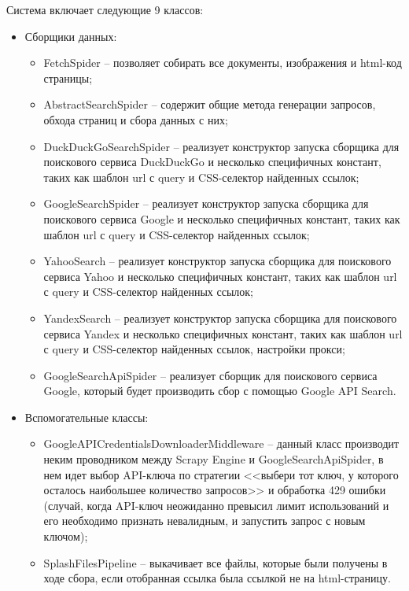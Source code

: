 Система включает следующие 9 классов:
\begin{itemize}
    \item Сборщики данных:
    \begin{itemize}
        \item FetchSpider -- позволяет собирать все документы, изображения и html-код страницы;  
        \item AbstractSearchSpider -- содержит общие метода генерации запросов, обхода страниц и сбора данных с них;
        \item DuckDuckGoSearchSpider -- реализует конструктор запуска сборщика для поискового сервиса DuckDuckGo и несколько 
        специфичных констант, таких как шаблон url с query и CSS-селектор найденных ссылок;
        \item GoogleSearchSpider -- реализует конструктор запуска сборщика для поискового сервиса Google и несколько 
        специфичных констант, таких как шаблон url с query и CSS-селектор найденных ссылок;
        \item YahooSearch -- реализует конструктор запуска сборщика для поискового сервиса Yahoo и несколько 
        специфичных констант, таких как шаблон url с query и CSS-селектор найденных ссылок;
        \item YandexSearch -- реализует конструктор запуска сборщика для поискового сервиса Yandex и несколько 
        специфичных констант, таких как шаблон url с query и CSS-селектор найденных ссылок, настройки прокси;
        \item GoogleSearchApiSpider -- реализует сборщик для поискового сервиса Google, который будет
        производить сбор с помощью Google API Search.
    \end{itemize}
    \item Вспомогательные классы:
    \begin{itemize}
        \item GoogleAPICredentialsDownloaderMiddleware -- данный класс производит неким проводником между Scrapy Engine и 
        GoogleSearchApiSpider, в нем идет выбор API-ключа по стратегии <<выбери тот ключ, у которого осталось 
        наибольшее количество запросов>> и обработка 429 ошибки (случай, когда API-ключ неожиданно превысил лимит 
        использований и его необходимо признать невалидным, и запустить запрос с новым ключом);
        \item SplashFilesPipeline -- выкачивает все файлы, которые были получены в ходе сбора, если отобранная 
        ссылка была ссылкой не на html-страницу. 
    \end{itemize}
\end{itemize}


